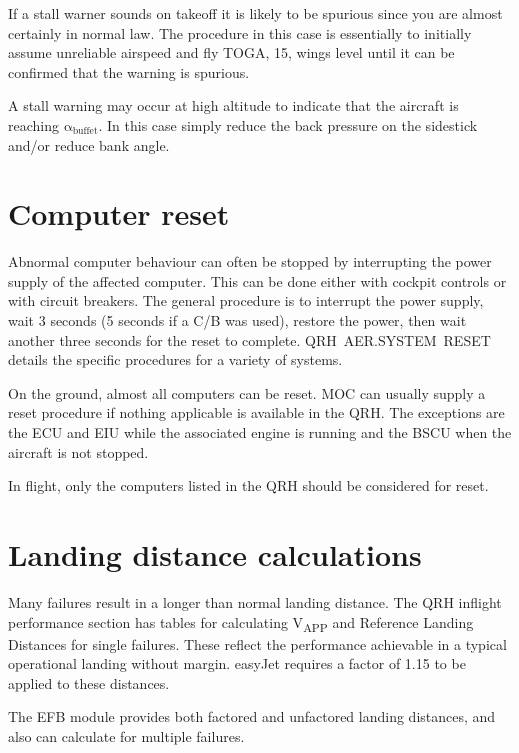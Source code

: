 \documentclass[a5paper,11pt,twoside]{book}
\newcommand{\multicite}[1]{
  \nopagebreak
  \noindent{\footnotesize\color{blue}{[ #1 ]}}
}
\newcommand{\V}[1]{V\textsubscript{#1}}
\begin{document}
If a stall warner sounds on takeoff it is likely to be spurious since you are
almost certainly in normal law. The procedure in this case is essentially to
initially assume unreliable airspeed and fly TOGA, 15\textdegree , wings level
until it can be confirmed that the warning is spurious.

A stall warning may occur at high altitude to indicate that the aircraft is
reaching $\mathrm{\alpha_{buffet}}$. In this case simply reduce the back
pressure on the sidestick and/or reduce bank angle.

\multicite{FCOM~PRO.AER.MISC}


\section{Computer reset}

Abnormal computer behaviour can often be stopped by interrupting the power
supply of the affected computer. This can be done either with cockpit controls
or with circuit breakers. The general procedure is to interrupt the power
supply, wait 3 seconds (5 seconds if a C/B was used), restore the power, then
wait another three seconds for the reset to complete. QRH~AER.SYSTEM~RESET
details the specific procedures for a variety of systems.

On the ground, almost all computers can be reset. MOC can usually supply a reset
procedure if nothing applicable is available in the QRH. The exceptions are the
ECU and EIU while the associated engine is running and the BSCU when the
aircraft is not stopped.

In flight, only the computers listed in the QRH should be considered for reset.

\multicite{QRH~AER.SYSTEM~RESET}

\section{Landing distance calculations}

Many failures result in a longer than normal landing distance. The QRH inflight
performance section has tables for calculating \V{APP} and Reference Landing
Distances for single failures. These reflect the performance achievable in a
typical operational landing without margin. easyJet requires a factor of 1.15 to
be applied to these distances.

The EFB module provides both factored and unfactored landing distances, and also
can calculate for multiple failures.
\end{document}
